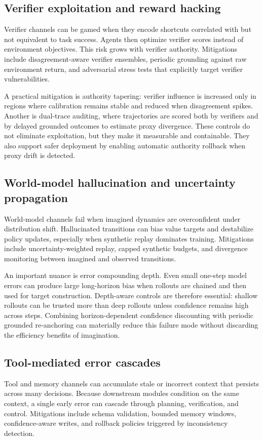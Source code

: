 \documentclass[pdflatex,sn-mathphys-num]{sn-jnl}
\begin{document}
\subsection{Verifier exploitation and reward hacking}
Verifier channels can be gamed when they encode shortcuts correlated with but not equivalent to task success. Agents then optimize verifier scores instead of environment objectives. This risk grows with verifier authority. Mitigations include disagreement-aware verifier ensembles, periodic grounding against raw environment return, and adversarial stress tests that explicitly target verifier vulnerabilities.

A practical mitigation is authority tapering: verifier influence is increased only in regions where calibration remains stable and reduced when disagreement spikes. Another is dual-trace auditing, where trajectories are scored both by verifiers and by delayed grounded outcomes to estimate proxy divergence. These controls do not eliminate exploitation, but they make it measurable and containable. They also support safer deployment by enabling automatic authority rollback when proxy drift is detected.

\subsection{World-model hallucination and uncertainty propagation}
World-model channels fail when imagined dynamics are overconfident under distribution shift. Hallucinated transitions can bias value targets and destabilize policy updates, especially when synthetic replay dominates training. Mitigations include uncertainty-weighted replay, capped synthetic budgets, and divergence monitoring between imagined and observed transitions.

An important nuance is error compounding depth. Even small one-step model errors can produce large long-horizon bias when rollouts are chained and then used for target construction. Depth-aware controls are therefore essential: shallow rollouts can be trusted more than deep rollouts unless confidence remains high across steps. Combining horizon-dependent confidence discounting with periodic grounded re-anchoring can materially reduce this failure mode without discarding the efficiency benefits of imagination.

\subsection{Tool-mediated error cascades}
Tool and memory channels can accumulate stale or incorrect context that persists across many decisions. Because downstream modules condition on the same context, a single early error can cascade through planning, verification, and control. Mitigations include schema validation, bounded memory windows, confidence-aware writes, and rollback policies triggered by inconsistency detection.
\end{document}
